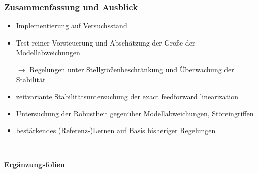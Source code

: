\documentclass[
	ngerman,
	10pt,				%
	aspectratio=169, 	%
	xcolor=dvipsnames
]{beamer}
\newcommand{\backupbegin}{
   \newcounter{finalframe}
   \setcounter{finalframe}{\value{framenumber}}
}
\begin{document}

\begin{frame}[label=Ausblick]
	\frametitle{Zusammenfassung und Ausblick}
	\begin{itemize}
		\item Implementierung auf Versuchsstand
		\pause
		\item Test reiner Vorsteuerung und Abschätzung der Größe der Modellabweichungen
		\pause
		\item[$\rightarrow$] Regelungen unter Stellgrößenbeschränkung und Überwachung der Stabilität
		\bigskip
		\pause 
		\item zeitvariante Stabilitätsuntersuchung der exact feedforward linearization
		\pause
		\item Untersuchung der Robustheit gegenüber Modellabweichungen, Störeingriffen
		\bigskip
		\pause
		\item bestärkendes (Referenz-)Lernen auf Basis bisheriger Regelungen
	\end{itemize}
	
\end{frame}


\begin{frame}[fragile,label=Ergaenzungsfolien]{~}
	\begin{center}
		{\huge \textbf{Ergänzungsfolien}} 
	\end{center}
	
\end{frame}

\backupbegin

\end{document}
